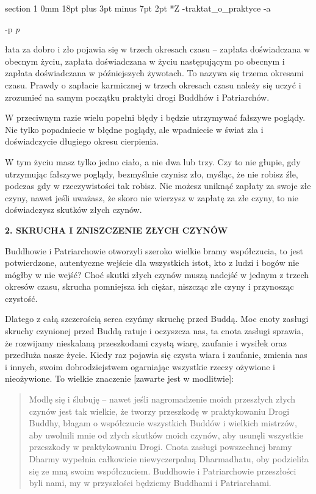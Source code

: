 \documentclass[12pt]{article}
\makeatletter
\renewcommand{\section}{\@startsection%
 {section}			%
 {1}				%
 {0mm}				%
 {18pt plus 3pt minus 7pt}	%
 { 2pt}				%
 {\bfseries}}			%
\newcounter{labelnum}
\newenvironment{Prayer}[4]{%
	\section*{#2}
	\ifx -#1
		\stepcounter{labelnum}\label{label.\arabic{labelnum}}\nopagebreak
	\else
		\label{#1}\nopagebreak
	\fi
	\ifx -#3
		\addcontentsline{toc}{section}{#2}
	\else
		\addcontentsline{toc}{section}{#3}
	\fi
	\ifx -#4
		{}
	\else
		\noindent\emph{#4}\par\nopagebreak
	\fi
	\begingroup
}
{\par\endgroup}
\makeatother
\begin{document}
\begin{Prayer}{traktat_o_praktyce}
Zapłata za dobro i zło pojawia się w trzech okresach czasu -- zapłata doświadczana w obecnym życiu,  zapłata doświadczana w życiu następującym po obecnym i zapłata doświadczana w późniejszych żywotach. To nazywa się trzema okresami czasu. Prawdy o zapłacie karmicznej w trzech okresach czasu należy się uczyć i zrozumieć na samym początku praktyki drogi Buddhów i Patriarchów.  


W przeciwnym razie wielu popełni błędy i będzie utrzymywać fałszywe poglądy. Nie tylko popadniecie w błędne poglądy, ale wpadniecie w świat zła i doświadczycie długiego okresu cierpienia. 


W tym życiu masz tylko jedno ciało, a nie dwa lub trzy. Czy to nie głupie, gdy utrzymując fałszywe poglądy, bezmyślnie czynisz zło, myśląc, że nie robisz źle, podczas gdy w rzeczywistości tak robisz. Nie możesz uniknąć zapłaty za swoje złe czyny, nawet jeśli uważasz, że skoro nie wierzysz w zapłatę za złe czyny, to nie doświadczysz skutków złych czynów.



\newpage
\par\noindent\textbf{2. SKRUCHA I ZNISZCZENIE ZŁYCH CZYNÓW}\par
\medskip

Buddhowie i Patriarchowie otworzyli szeroko wielkie bramy współczucia, to jest potwierdzone, autentyczne wejście dla wszystkich istot, kto z ludzi i bogów nie mógłby w nie wejść? Choć skutki złych czynów muszą nadejść w jednym z trzech okresów czasu, skrucha pomniejsza ich ciężar, niszcząc złe czyny i przynosząc czystość. 


Dlatego z całą szczerością serca czyńmy skruchę przed Buddą. Moc cnoty zasługi skruchy czynionej przed Buddą ratuje i oczyszcza nas, ta cnota zasługi sprawia, że rozwijamy nieskalaną przeszkodami czystą wiarę, zaufanie i wysiłek oraz przedłuża nasze życie. Kiedy raz pojawia się czysta wiara i zaufanie, zmienia nas i innych, swoim dobrodziejstwem ogarniając  wszystkie rzeczy ożywione i nieożywione. To wielkie znaczenie [zawarte jest w modlitwie]:


\begin{quote}


Modlę się i ślubuję -- nawet jeśli nagromadzenie moich przeszłych złych czynów jest tak wielkie, że tworzy przeszkodę w praktykowaniu Drogi Buddhy, błagam o współczucie wszystkich  Buddów i wielkich mistrzów, aby uwolnili mnie od złych skutków moich czynów, aby usunęli wszystkie przeszkody w praktykowaniu Drogi. Cnota zasługi powszechnej bramy Dharmy wypełnia całkowicie niewyczerpalną Dharmadhatu, oby podzieliła się ze mną swoim współczuciem. Buddhowie i Patriarchowie przeszłości byli nami, my w przyszłości będziemy Buddhami i Patriarchami.


\end{quote}
\end{Prayer}
\end{document}

